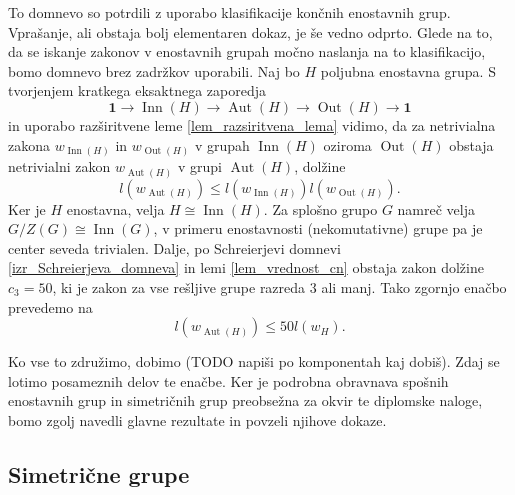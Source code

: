 To domnevo so potrdili z uporabo klasifikacije končnih enostavnih grup. Vprašanje, ali obstaja bolj elementaren dokaz, je še vedno odprto. %
Glede na to, da se iskanje zakonov v enostavnih grupah močno naslanja na to klasifikacijo, bomo domnevo brez zadržkov uporabili. Naj bo $H$ poljubna enostavna grupa. 
S tvorjenjem kratkega eksaktnega zaporedja \begin{equation*}
    \mathbf{1} \to \operatorname{Inn}(H)  \to \operatorname{Aut}(H)  \to  \operatorname{Out}(H)  \to  \mathbf{1}
\end{equation*}  
in uporabo razširitvene leme \ref{lem_razsiritvena_lema} vidimo, da za netrivialna zakona $w_{\operatorname{Inn}(H) }$ in $w_{\operatorname{Out}(H) }$ v grupah $\operatorname{Inn}(H) $ oziroma $\operatorname{Out}(H) $ obstaja netrivialni zakon $w_{\operatorname{Aut}(H) }$ v grupi $\operatorname{Aut}(H) $, dolžine \begin{equation*}
    l(w_{\operatorname{Aut}(H) }) \le  l(w_{\operatorname{Inn}(H) }) l (w_{ \operatorname{Out}(H) }).
    \end{equation*}    
Ker je $H$ enostavna, velja $H \cong \operatorname{Inn}(H)$. Za splošno grupo $G$ namreč velja $ G / Z(G) \cong \operatorname{Inn}(G)$, v primeru enostavnosti (nekomutativne) grupe pa je center seveda trivialen. Dalje, po Schreierjevi domnevi \ref{izr_Schreierjeva_domneva} in lemi \ref{lem_vrednost_cn} obstaja zakon dolžine $c_3 = 50$, ki je zakon za vse rešljive grupe razreda $3$ ali manj.
Tako zgornjo enačbo prevedemo na \begin{equation*}
    l(w_{\operatorname{Aut}(H) }) \le  50 l(w_H).
\end{equation*}  


Ko vse to združimo, dobimo (TODO napiši po komponentah kaj dobiš). Zdaj se lotimo posameznih delov te enačbe. Ker je podrobna obravnava spošnih enostavnih grup in simetričnih grup preobsežna za okvir te diplomske naloge, bomo zgolj navedli glavne rezultate in povzeli njihove dokaze.

\subsection{Simetrične grupe}



